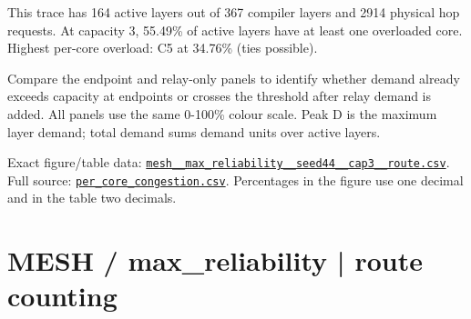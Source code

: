 \documentclass[10pt,a4paper]{article}
\begin{document}
This trace has 164 active layers out of 367 compiler layers and 2914 physical hop requests. At capacity 3, 55.49\% of active layers have at least one overloaded core. Highest per-core overload: C5 at 34.76\% (ties possible).\par
Compare the endpoint and relay-only panels to identify whether demand already exceeds capacity at endpoints or crosses the threshold after relay demand is added. All panels use the same 0-100\% colour scale. Peak D is the maximum layer demand; total demand sums demand units over active layers.\par
Exact figure/table data: \href{\detokenize{file:///home/dhruv-pansuriya/Documents/BTP/Compiler-Driven-ACE/output/pdf/qaoa_methods_congestion/tables/mesh__max_reliability__seed44__cap3__route.csv}}{\nolinkurl{mesh__max_reliability__seed44__cap3__route.csv}}. Full source: \href{\detokenize{file:///home/dhruv-pansuriya/Documents/BTP/Compiler-Driven-ACE/results/qaoa_2seed_2026-10-26/congestion/per_core_congestion.csv}}{\nolinkurl{per_core_congestion.csv}}. Percentages in the figure use one decimal and in the table two decimals.\par
\clearpage
\section*{MESH / max\_reliability | route counting}
\end{document}
